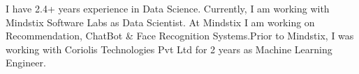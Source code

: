 
\begin{cvparagraph}
I have 2.4+ years experience in Data Science. Currently, I am working with Mindstix Software Labs as Data Scientist. At Mindstix I am working on Recommendation, ChatBot \& Face Recognition Systems.\newline Prior to Mindstix, I was working with Coriolis Technologies Pvt Ltd for 2 years as Machine Learning Engineer.
\end{cvparagraph}
